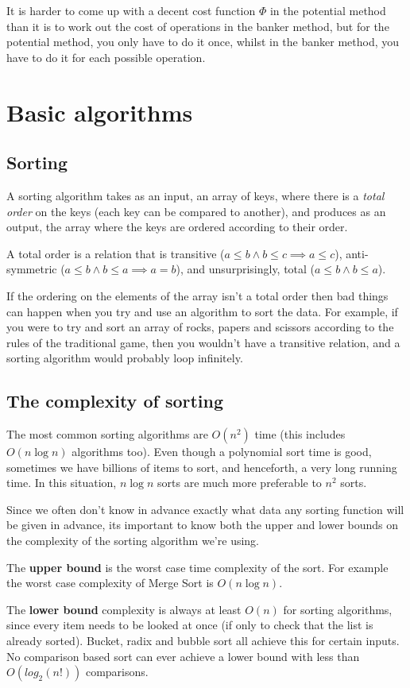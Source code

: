 It is harder to come up with a decent cost function $\Phi$ in the potential
method than it is to work out the cost of operations in the banker method, but
for the potential method, you only have to do it once, whilst in the banker
method, you have to do it for each possible operation.

\section{Basic algorithms}

\subsection{Sorting}

A sorting algorithm takes as an input, an array of keys, where there is a
\textit{total order} on the keys (each key can be compared to another), and
produces as an output, the array where the keys are ordered according to their
order.

A total order is a relation that is transitive ($a \leq b \wedge b \leq c \implies a
\leq c$), anti-symmetric ($a \leq b \wedge b \leq a \implies a = b$), and
unsurprisingly, total ($a \leq b \wedge b \leq a$).

If the ordering on the elements of the array isn't a total order then bad
things can happen when you try and use an algorithm to sort the data. For
example, if you were to try and sort an array of rocks, papers and scissors
according to the rules of the traditional game, then you wouldn't have a
transitive relation, and a sorting algorithm would probably loop infinitely.

\subsection{The complexity of sorting}

The most common sorting algorithms are $O(n^2)$ time (this includes $O(n
\log{n})$ algorithms too). Even though a polynomial sort time is good, sometimes
we have billions of items to sort, and henceforth, a very long running time. In
this situation, $n \log{n}$ sorts are much more preferable to $n^2$ sorts.

Since we often don't know in advance exactly what data any sorting function will
be given in advance, its important to know both the upper and lower bounds on
the complexity of the sorting algorithm we're using.

\begin{description}
  \item The \textbf{upper bound} is the worst case time complexity of the
  sort. For example the worst case complexity of Merge Sort is $O(n \log{n})$.

  \item The \textbf{lower bound} complexity is always at least $O(n)$ for
  sorting algorithms, since every item needs to be looked at once (if only to
  check that the list is already sorted). Bucket, radix and bubble sort all
  achieve this for certain inputs. No comparison based sort can ever achieve
  a lower bound with less than $O(log_2(n!))$ comparisons.
\end{description}

